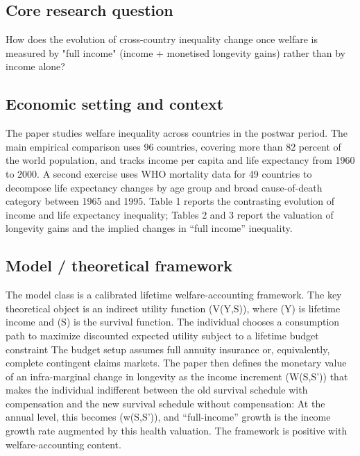 \documentclass[11pt,a4paper]{article}
\begin{document}
\subsection*{Core research question}
How does the evolution of cross-country inequality change once welfare is measured by "full income" (income + monetised longevity gains) rather than by income alone?

\subsection*{Economic setting and context}
The paper studies welfare inequality across countries in the postwar period. The main empirical comparison uses 96 countries, covering more than 82 percent of the world population, and tracks income per capita and life expectancy from 1960 to 2000. A second exercise uses WHO mortality data for 49 countries to decompose life expectancy changes by age group and broad cause-of-death category between 1965 and 1995. Table 1 reports the contrasting evolution of income and life expectancy inequality; Tables 2 and 3 report the valuation of longevity gains and the implied changes in “full income” inequality.

\subsection*{Model / theoretical framework}
The model class is a calibrated lifetime welfare-accounting framework. The key theoretical object is an indirect utility function (V(Y,S)), where (Y) is lifetime income and (S) is the survival function. The individual chooses a consumption path to maximize discounted expected utility subject to a lifetime budget constraint The budget setup assumes full annuity insurance or, equivalently, complete contingent claims markets. The paper then defines the monetary value of an infra-marginal change in longevity as the income increment (W(S,S')) that makes the individual indifferent between the old survival schedule with compensation and the new survival schedule without compensation: At the annual level, this becomes (w(S,S')), and “full-income” growth is the income growth rate augmented by this health valuation. The framework is positive with welfare-accounting content.
\end{document}
